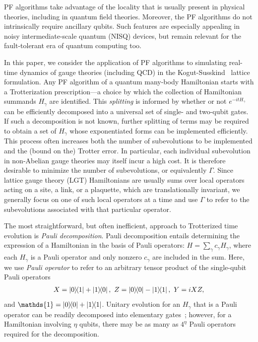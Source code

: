 \documentclass[aps,prd,twocolumn,showpacs,groupedaddress,superscriptaddress,nofootinbib,floatfix,preprintnumbers,longbibliography]{revtex4-1}
\begin{document}
PF algorithms take advantage of the locality that is usually present in physical theories, including in quantum field theories. Moreover, the PF algorithms do not intrinsically require ancillary qubits. Such features are especially appealing in noisy intermediate-scale quantum (NISQ) devices, but remain relevant for the fault-tolerant era of quantum computing too.

In this paper, we consider the application of PF algorithms to simulating real-time dynamics of gauge theories (including QCD) in the Kogut-Susskind~\cite{Kogut:1974ag} lattice formulation. Any PF algorithm of a quantum many-body Hamiltonian starts with a Trotterization prescription---a choice by which the collection of Hamiltonian summands $H_\gamma$ are identified. This \emph{splitting} is informed by whether or not $e^{-itH_\gamma}$ can be efficiently decomposed into a universal set of single- and two-qubit gates. If such a decomposition is not known, further splitting of terms may be required to obtain a set of $H_\gamma$ whose exponentiated forms can be implemented efficiently. This process often increases both the number of subevolutions to be implemented and the (bound on the) Trotter error. In particular, each individual subevolution in non-Abelian gauge theories may itself incur a high cost. It is therefore desirable to minimize the number of subevolutions, or equivalently $\Gamma$. Since lattice gauge theory (LGT) Hamiltonians are usually sums over local operators acting on a site, a link, or a plaquette, which are translationally invariant, we generally focus on one of such local operators at a time and use $\Gamma$ to refer to the subevolutions associated with that particular operator.

The most straightforward, but often inefficient, approach to Trotterized time evolution is \emph{Pauli decomposition}. 
Pauli decomposition entails determining the expression of a Hamiltonian in the basis of Pauli operators: $H=\sum_\gamma c_\gamma H_\gamma$, where each $H_\gamma$ is a Pauli operator and only nonzero $c_\gamma$ are included in the sum.
Here, we use \emph{Pauli operator} to refer to an arbitrary tensor product of the single-qubit Pauli operators
%
\begin{align}
    X=\ket{0}\!\!\bra{1}+\ket{1}\!\!\bra{0}, \ Z=\ket{0}\!\!\bra{0}-\ket{1}\!\!\bra{1}, \
    Y=i X Z,
\end{align}
%
and $\mathds{1}=\ket{0}\!\!\bra{0}+\ket{1}\!\!\bra{1}$.
Unitary evolution for an $H_\gamma$ that is a Pauli operator can be readily decomposed into elementary gates~\cite{Nielsen:2012yss}; however, for a Hamiltonian involving $\eta$ qubits, there may be as many as $4^\eta$ Pauli operators required for the decomposition.
\end{document}
